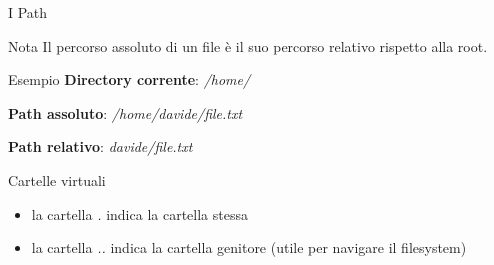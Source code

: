 \documentclass{beamer}
\begin{document}
    \begin{frame}{I Path}
        \begin{alertblock}{Nota}
            Il percorso assoluto di un file è il suo percorso relativo rispetto
            alla root.
        \end{alertblock}

        \begin{exampleblock}{Esempio}
            \textbf{Directory corrente}: \textit{/home/}

            \textbf{Path assoluto}: \textit{/home/davide/file.txt}

            \textbf{Path relativo}: \textit{davide/file.txt}
        \end{exampleblock}

        \begin{block}{Cartelle virtuali}
            \begin{itemize}
                \item la cartella \textit{.} indica la cartella stessa
                \item la cartella \textit{..} indica la cartella genitore (utile per navigare il filesystem)
            \end{itemize}
        \end{block}
    \end{frame}
\end{document}
